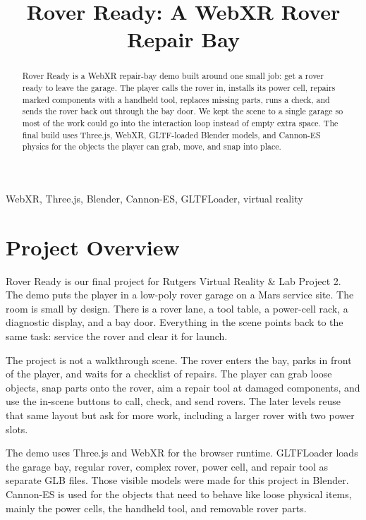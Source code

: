 \documentclass[conference]{IEEEtran}
\begin{document}
\title{Rover Ready: A WebXR Rover Repair Bay}

\author{
}

\maketitle

\begin{abstract}
	Rover Ready is a WebXR repair-bay demo built around one small job: get a rover
	ready to leave the garage. The player calls the rover in, installs its power
	cell, repairs marked components with a handheld tool, replaces missing parts,
	runs a check, and sends the rover back out through the bay door. We kept the
	scene to a single garage so most of the work could go into the interaction loop
	instead of empty extra space. The final build uses Three.js, WebXR, GLTF-loaded
	Blender models, and Cannon-ES physics for the objects the player can grab,
	move, and snap into place.
\end{abstract}

\begin{IEEEkeywords}
	WebXR, Three.js, Blender, Cannon-ES, GLTFLoader, virtual reality
\end{IEEEkeywords}

\section{Project Overview}

Rover Ready is our final project for Rutgers Virtual Reality \& Lab Project 2.
The demo puts the player in a low-poly rover garage on a Mars service site. The
room is small by design. There is a rover lane, a tool table, a power-cell rack,
a diagnostic display, and a bay door. Everything in the scene points back to the
same task: service the rover and clear it for launch.

The project is not a walkthrough scene. The rover enters the bay, parks in front
of the player, and waits for a checklist of repairs. The player can grab loose
objects, snap parts onto the rover, aim a repair tool at damaged components, and
use the in-scene buttons to call, check, and send rovers. The later levels reuse
that same layout but ask for more work, including a larger rover with two power
slots.

The demo uses Three.js and WebXR for the browser runtime. GLTFLoader loads the
garage bay, regular rover, complex rover, power cell, and repair tool as
separate GLB files. Those visible models were made for this project in Blender.
Cannon-ES is used for the objects that need to behave like loose physical items,
mainly the power cells, the handheld tool, and removable rover parts.
\end{document}
